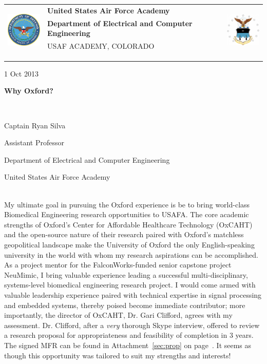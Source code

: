 \documentclass{article}
\begin{document}
	\noindent \begin{tabu} to \textwidth{l X[c] r}
	 & 
	\textbf{United States Air Force Academy} &  
	\\
	& \textbf{Department of Electrical and Computer Engineering} & \\
	& \tiny{USAF ACADEMY, COLORADO}\\
	\\ \\ \\
	\end{tabu}

	\hfill 1 Oct 2013
	\centerline{\LARGE{\textbf{Why Oxford?}}} \hspace{0pt} \\
	\centerline{\Large{Captain Ryan Silva}}
	\centerline{\large{Assistant Professor}}
	\centerline{\large{Department of Electrical and Computer Engineering}}
	\centerline{\large{United States Air Force Academy}} \hspace{0pt} \\
\indent My ultimate goal in pursuing the Oxford experience is be to bring world-class
Biomedical Engineering research opportunities to USAFA. The core academic
strengths of Oxford's Center for Affordable Healthcare Technology (OxCAHT) and
the open-source nature of their research paired with Oxford's matchless
geopolitical landscape make the University of Oxford the only English-speaking
university in the world with whom my research aspirations can be accomplished.
As a project mentor for the FalconWorks-funded senior capstone project
NeuMimic, I bring valuable experience leading a successful multi-disciplinary,
systems-level biomedical engineering research project. I would come armed with 
valuable leadership experience paired with technical expertise in signal processing and 
embedded systems, thereby poised become immediate contributor; more importantly, the director of OxCAHT, Dr. Gari Clifford, agrees with my assessment. Dr. Clifford, after a \emph{very} thorough Skype interview, offered to review a research proposal for appropriateness and feasibility of completion in 3 years. The signed MFR can be found in Attachment~\ref{sec:prop} on page~\pageref{sec:prop}. 
It seems as though this opportunity was tailored to suit my strengths and interests! 
 
\end{document}
